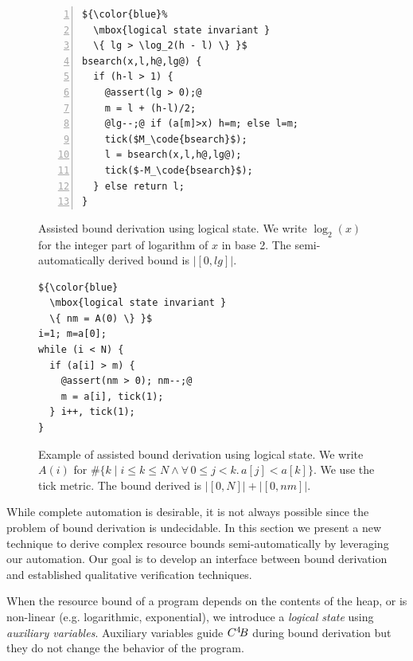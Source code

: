 \documentclass{sigplanconf}
\begin{document}
\begin{figure}
\vspace{-.3cm}
\begin{lstlisting}[numbers=left]
${\color{blue}%
  \mbox{logical state invariant }
  \{ lg > \log_2(h - l) \} }$
bsearch(x,l,h@,lg@) {
  if (h-l > 1) {
    @assert(lg > 0);@
    m = l + (h-l)/2;
    @lg--;@ if (a[m]>x) h=m; else l=m;
    tick($M_\code{bsearch}$);
    l = bsearch(x,l,h@,lg@);
    tick($-M_\code{bsearch}$);
  } else return l;
}
\end{lstlisting}
\vspace{-.2cm}
\caption{Assisted bound derivation using logical state.
  We write $\log_2(x)$ for the integer part of
  logarithm of $x$ in base 2.
  The semi-automatically derived bound is $|[0,lg]|$.
  }
\label{fig:xmplbsaux}
\end{figure}

\ifdefined\fullversion
\begin{figure}
\begin{lstlisting}
${\color{blue}
  \mbox{logical state invariant }
  \{ nm = A(0) \} }$
i=1; m=a[0];
while (i < N) {
  if (a[i] > m) {
    @assert(nm > 0); nm--;@
    m = a[i], tick(1);
  } i++, tick(1);
}
\end{lstlisting}
\caption{Example of assisted bound derivation using logical state.
  We write $A(i)$ for
  $\#\{ k \mid i \le k \le N \land \forall\, 0\le j<k.\, a[j] < a[k]\}$.
  We use the tick metric.  The bound derived is $|[0,N]| + |[0,nm]|$.
  }
\label{fig:xmplmax}
\end{figure}
\fi


While complete automation is desirable, it is not always possible
since the problem of bound derivation is undecidable.  In this section
we present a new technique to derive complex resource bounds
semi-automatically by leveraging our automation. Our goal is to
develop an interface between bound derivation and
established qualitative verification techniques.

When the resource bound of a program depends on the contents of the
heap, or is non-linear (e.g. logarithmic, exponential), we
introduce a \emph{logical state} using \emph{auxiliary variables}.
Auxiliary variables guide $C^4\!B$ during bound derivation
but they do not change the behavior of the program.
\end{document}
